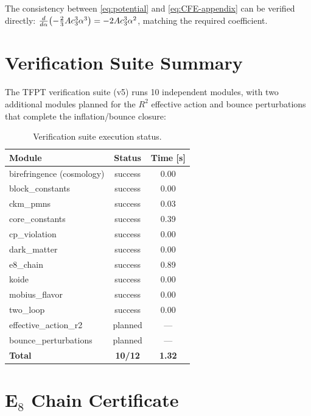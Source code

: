 \begin{remark}
The consistency between \eqref{eq:potential} and \eqref{eq:CFE-appendix} can be 
verified directly: $\frac{d}{d\alpha}\bigl(-\frac{2}{3}Ac_3^3\alpha^3\bigr) 
= -2Ac_3^3\alpha^2$, matching the required coefficient.
\end{remark}

\section{Verification Suite Summary}

The TFPT verification suite (v5) runs 10 independent modules, with two additional
modules planned for the $R^2$ effective action and bounce perturbations that
complete the inflation/bounce closure:

\begin{table}[H]
\centering
\begin{tabular}{@{}lcc@{}}
\toprule
\textbf{Module} & \textbf{Status} & \textbf{Time [s]}\\
\midrule
birefringence (cosmology) & success & 0.00\\
block\_constants & success & 0.00\\
ckm\_pmns & success & 0.03\\
core\_constants & success & 0.39\\
cp\_violation & success & 0.00\\
dark\_matter & success & 0.00\\
e8\_chain & success & 0.89\\
koide & success & 0.00\\
mobius\_flavor & success & 0.00\\
two\_loop & success & 0.00\\
effective\_action\_r2 & planned & ---\\
bounce\_perturbations & planned & ---\\
\midrule
\textbf{Total} & \textbf{10/12} & \textbf{1.32}\\
\bottomrule
\end{tabular}
\caption{Verification suite execution status.}
\end{table}

\section{E$_8$ Chain Certificate}
\label{app:E8cert}

